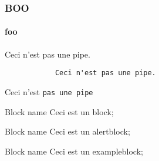 \documentclass{beamer}
\subtitle{TODO}
\title{}
\institute[Paris 8]{Paris VIII}
\author{Chaolei CAI}
\date{\today}
\begin{document}
    \frame{\titlepage}
    \tableofcontents

    \begin{frame}[fragile]%
        \frametitle{BOO}
        \framesubtitle{foo}
        Ceci n'est pas une pipe.
        \begin{verbatim}
            Ceci n'est pas une pipe.
        \end{verbatim}
            Ceci n'est \texttt{pas une pipe}
    \end{frame}

    \begin{frame}
        \begin{block}{Block name}
            Ceci est un block;
        \end{block}
        \begin{alertblock}{Block name}
            Ceci est un alertblock;
        \end{alertblock}
        \begin{exampleblock}{Block name}
            Ceci est un exampleblock;
        \end{exampleblock}

    \end{frame}
\end{document}
